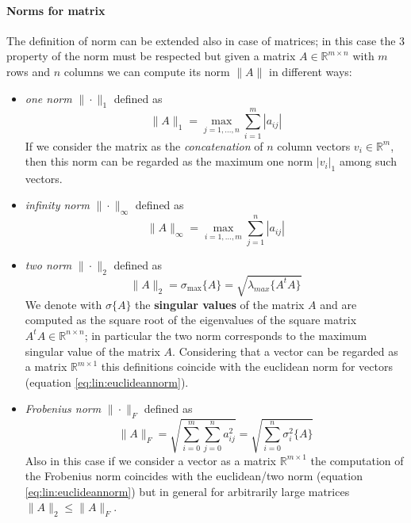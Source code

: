 	\paragraph{Norms for matrix} The definition of norm can be extended also in case of matrices; in this case the 3 property of the norm must be respected but given a matrix $A \in \mathds R^{m\times n}$ with $m$ rows and $n$ columns we can compute its norm $\| A\|$ in different ways:
	\begin{itemize}
		\item \textit{one norm} $\|\cdot\|_1$ defined as
		\begin{equation}
			\|A\|_1 = \max_{j=1,\dots, n} \sum_{i=1}^m |a_{ij}|
		\end{equation}
		If we consider the matrix as the \textit{concatenation} of $n$ column vectors $v_i \in \mathds R^m$, then this norm can be regarded as the maximum one norm $|v_i|_1$ among such vectors.
		
		\item \textit{infinity norm} $\|\cdot\|_\infty$ defined as
		\begin{equation}
			\|A\|_\infty = \max_{i = 1,\dots,m} \sum_{j=1}^n |a_{ij}|
		\end{equation}
		\item \textit{two norm} $\|\cdot\|_2$ defined as
		\begin{equation}
			\|A\|_2 = \sigma_{\max}\{ A \} = \sqrt{\lambda_{max} \{ A^t A \}  }
		\end{equation}
		We denote with $\sigma\{A\}$ the \textbf{singular values} of the matrix $A$ and are computed as the square root of the eigenvalues of the square matrix $A^t A \in \mathds R^{n\times n}$; in particular the two norm corresponds to the maximum singular value of the matrix $A$. Considering that a vector can be regarded as a matrix $\mathds R^{m\times 1}$ this definitions coincide with the euclidean norm for vectors (equation \ref{eq:lin:euclideannorm}).
		
		\item \textit{Frobenius norm} $\|\cdot\|_F$ defined as
		\begin{equation}
			\|A\|_F = \sqrt{ \sum_{i=0}^m \sum_{j=0}^n a_{ij}^2 } = \sqrt{ \sum_{i=0}^n \sigma_i^2\{A\} }
		\end{equation} 
		Also in this case if we consider a vector as a matrix $\mathds R^{m\times 1}$ the computation of the Frobenius norm coincides with the euclidean/two norm (equation \ref{eq:lin:euclideannorm}) but in general for arbitrarily large matrices $\|A\|_2 \leq \|A\|_F$.
	\end{itemize}
	
